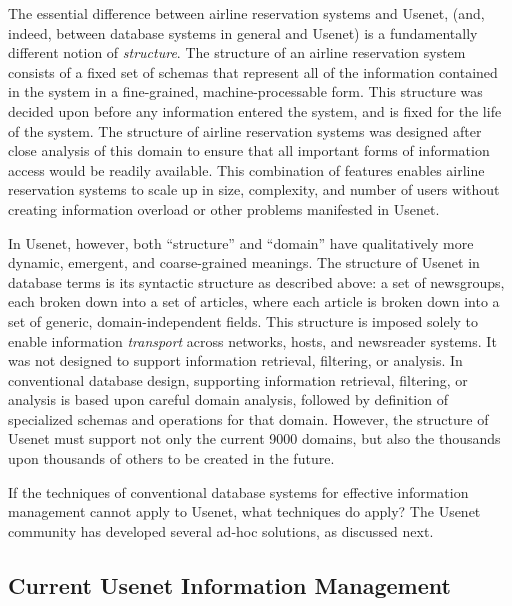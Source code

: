 
The essential difference between airline reservation systems and Usenet, (and,
indeed, between database systems in general and Usenet) is a fundamentally
different notion of {\em structure}.  The structure of an airline reservation
system consists of a fixed set of schemas that represent all of the information
contained in the system in a fine-grained, machine-processable form.  This
structure was decided upon before any information entered the system, and is
fixed for the life of the system.  The structure of airline reservation systems
was designed after close analysis of this domain to ensure that all important
forms of information access would be readily available.  This combination of
features enables airline reservation systems to scale up in size, complexity,
and number of users without creating information overload or other problems
manifested in Usenet.

In Usenet, however, both ``structure'' and ``domain'' have qualitatively
more dynamic, emergent, and coarse-grained meanings.  The structure of
Usenet in database terms is its syntactic structure as described above: a
set of newsgroups, each broken down into a set of articles, where each
article is broken down into a set of generic, domain-independent fields.
This structure is imposed solely to enable information {\em transport}
across networks, hosts, and newsreader systems.  It was not designed to
support information retrieval, filtering, or analysis.  In conventional
database design, supporting information retrieval, filtering, or analysis
is based upon careful domain analysis, followed by definition of
specialized schemas and operations for that domain.  However, the structure
of Usenet must support not only the current 9000 domains, but also the
thousands upon thousands of others to be created in the future. 

If the techniques of conventional database systems for effective information
management cannot apply to Usenet, what techniques do apply?  The Usenet
community has developed several ad-hoc solutions, as discussed next.

\subsection{Current Usenet Information Management}

